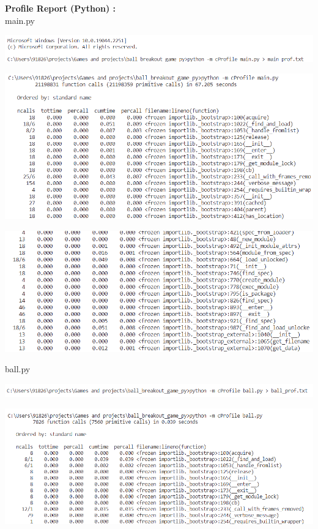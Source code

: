 \documentclass{article}
\begin{document}
\textbf{\bf Profile Report (Python) : \\}
main.py
\begin{center}{\centering\includegraphics[scale=0.75]{python_main_prof_00}}\end{center}
\begin{center}{\centering\includegraphics[scale=0.70]{python_main_prof_01}}\end{center}
\begin{center}{\centering\includegraphics[scale=0.70]{python_main_prof_02}}\end{center}
ball.py
\begin{center}{\centering\includegraphics[scale=0.75]{python_ball_prof_00}}\end{center}
\begin{center}{\centering\includegraphics[scale=0.70]{python_ball_prof_01}}\end{center}
\end{document}
